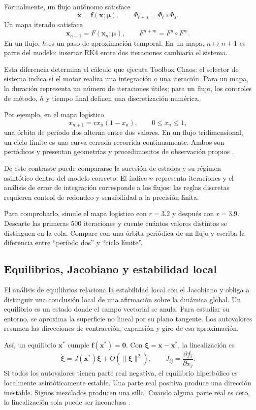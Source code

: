 \documentclass[11pt,a4paper]{article}
\begin{document}
Formalmente, un flujo autónomo satisface
\[
  \dot{\mathbf{x}}=\mathbf{f}(\mathbf{x};\boldsymbol\mu),\qquad
  \Phi_{t+s}=\Phi_t\circ\Phi_s .
\]
Un mapa iterado satisface
\[
  \mathbf{x}_{n+1}=F(\mathbf{x}_n;\boldsymbol\mu),\qquad F^{n+m}=F^n\circ F^m .
\]
En un flujo, $h$ es un paso de aproximación temporal. En un mapa, $n\mapsto n+1$
es parte del modelo: insertar RK4 entre dos iteraciones cambiaría el sistema.

Esta diferencia determina el cálculo que ejecuta Toolbox Chaos: el selector de sistema
indica si el motor realiza una integración o una iteración.
Para un mapa, la duración representa un número de iteraciones útiles; para un flujo,
los controles de método, $h$ y tiempo final definen una discretización numérica.

Por ejemplo, en el mapa logístico
\[
  x_{n+1}=r x_n(1-x_n),\qquad 0\le x_n\le1,
\]
una órbita de período dos alterna entre dos valores. En un flujo tridimensional, un
ciclo límite es una curva cerrada recorrida continuamente. Ambos son periódicos y
presentan geometrías y procedimientos de observación propios \cite{may1976,devaney1989}.

De este contraste puede compararse la sucesión de estados y su régimen asintótico
dentro del modelo
correcto. El índice $n$ representa iteraciones y el análisis de error de integración corresponde a los flujos; las reglas discretas requieren control de redondeo y sensibilidad a la precisión finita.

Para comprobarlo, simule el mapa logístico con $r=3.2$ y después con $r=3.9$.
Descarte las primeras
500 iteraciones y cuente cuántos valores distintos se distinguen en la cola. Compare
con una órbita periódica de un flujo y escriba la diferencia entre ``período dos'' y
``ciclo límite''.

\subsection{Equilibrios, Jacobiano y estabilidad local}

El análisis de equilibrios relaciona la estabilidad local con el Jacobiano y obliga a
distinguir una conclusión local de una afirmación sobre la dinámica global. Un
equilibrio es un estado donde el campo vectorial se anula. Para estudiar su entorno,
se aproxima la superficie no lineal por su plano tangente.
Los autovalores resumen las direcciones de contracción, expansión y giro de esa
aproximación.

Así, un equilibrio $\mathbf{x}^*$ cumple $\mathbf f(\mathbf{x}^*)=\mathbf 0$. Con
$\boldsymbol\xi=\mathbf{x}-\mathbf{x}^*$, la linealización es
\[
  \dot{\boldsymbol\xi}=J(\mathbf{x}^*)\boldsymbol\xi+O(\|\boldsymbol\xi\|^2),
  \qquad J_{ij}=\frac{\partial f_i}{\partial x_j}.
\]
Si todos los autovalores tienen parte real negativa, el equilibrio hiperbólico es
localmente asintóticamente estable. Una parte real positiva produce una dirección
inestable. Signos mezclados producen una silla. Cuando alguna parte real es cero, la
linealización sola puede ser inconclusa \cite{strogatz2024}.
\end{document}
